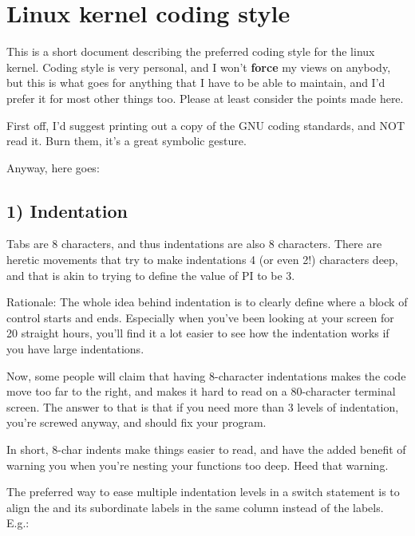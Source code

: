 \documentclass[a4paper,8pt,english]{sphinxmanual}
\begin{document}
\chapter{Linux kernel coding style}
\label{process/coding-style:codingstyle}\label{process/coding-style::doc}\label{process/coding-style:linux-kernel-coding-style}
This is a short document describing the preferred coding style for the
linux kernel.  Coding style is very personal, and I won't \textbf{force} my
views on anybody, but this is what goes for anything that I have to be
able to maintain, and I'd prefer it for most other things too.  Please
at least consider the points made here.

First off, I'd suggest printing out a copy of the GNU coding standards,
and NOT read it.  Burn them, it's a great symbolic gesture.

Anyway, here goes:


\section{1) Indentation}
\label{process/coding-style:indentation}
Tabs are 8 characters, and thus indentations are also 8 characters.
There are heretic movements that try to make indentations 4 (or even 2!)
characters deep, and that is akin to trying to define the value of PI to
be 3.

Rationale: The whole idea behind indentation is to clearly define where
a block of control starts and ends.  Especially when you've been looking
at your screen for 20 straight hours, you'll find it a lot easier to see
how the indentation works if you have large indentations.

Now, some people will claim that having 8-character indentations makes
the code move too far to the right, and makes it hard to read on a
80-character terminal screen.  The answer to that is that if you need
more than 3 levels of indentation, you're screwed anyway, and should fix
your program.

In short, 8-char indents make things easier to read, and have the added
benefit of warning you when you're nesting your functions too deep.
Heed that warning.

The preferred way to ease multiple indentation levels in a switch statement is
to align the  and its subordinate  labels in the same column
instead of  the  labels.  E.g.:
\end{document}
